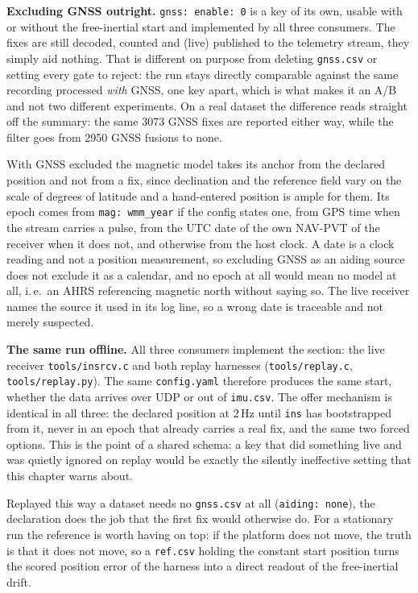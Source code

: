 \documentclass[11pt,a4paper]{article}
\newcommand{\code}[1]{\texttt{#1}}
\begin{document}
\noindent\textbf{Excluding GNSS outright.} \code{gnss: enable: 0} is a key of
its own, usable with or without the free-inertial start and implemented by all
three consumers. The fixes are still decoded, counted and (live) published to
the telemetry stream, they simply aid nothing. That is different on purpose
from deleting \code{gnss.csv} or setting every gate to reject: the run stays
directly comparable against the same recording processed \emph{with} GNSS, one
key apart, which is what makes it an A/B and not two different experiments.
On a real dataset the difference reads straight off the summary: the same
3073 GNSS fixes are reported either way, while the filter goes from 2950 GNSS
fusions to none.

With GNSS excluded the magnetic model takes its anchor from the declared
position and not from a fix, since declination and the reference field vary
on the scale of degrees of latitude and a hand-entered position is ample for
them. Its epoch comes from \code{mag: wmm\_\allowbreak{}year} if the config states one, from
GPS time when the stream carries a pulse, from the UTC date of the own NAV-PVT
of the receiver when it does not, and otherwise from the host clock. A date is a
clock reading and not a position measurement, so excluding GNSS as an
aiding source does not exclude it as a calendar, and no epoch at all would mean
no model at all, i.\,e.\ an AHRS referencing magnetic north without saying so. The
live receiver names the source it used in its log line, so a wrong date is
traceable and not merely suspected.

\medskip
\noindent\textbf{The same run offline.} All three consumers implement the
section: the live receiver \code{tools/insrcv.c} and both replay harnesses
(\code{tools/replay.c}, \code{tools/replay.py}). The same \code{config.yaml}
therefore produces the same start, whether the data arrives over UDP or out of
\code{imu.csv}. The offer mechanism is identical in all three: the declared
position at 2\,Hz until \code{ins} has bootstrapped from it, never in an epoch
that already carries a real fix, and the same two forced options. This is
the point of a shared schema: a key that did something live and was quietly
ignored on replay would be exactly the silently ineffective setting that this
chapter warns about.

Replayed this way a dataset needs no \code{gnss.csv} at all
(\code{aiding: none}), the declaration does the job that the first fix would
otherwise do. For a stationary run the reference is worth having on top: if the
platform does not move, the truth is that it does not move, so a
\code{ref.csv} holding the constant start position turns the scored
position error of the harness into a direct readout of the free-inertial drift.
\end{document}

